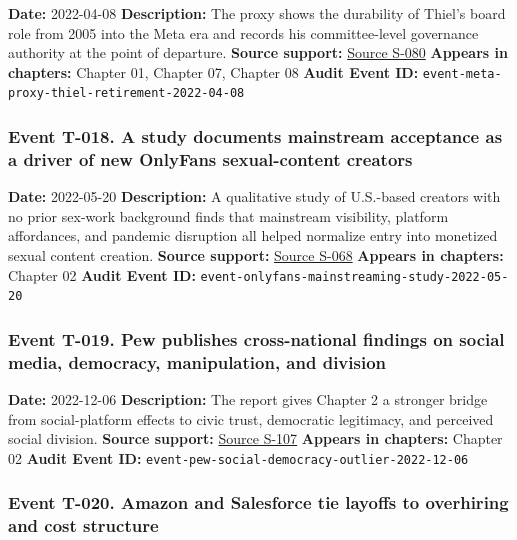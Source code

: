 \documentclass[
  american,
  11pt,
  letterpaper,
]{article}
\begin{document}
\textbf{Date:} 2022-04-08 \textbf{Description:} The proxy shows the
durability of Thiel's board role from 2005 into the Meta era and records
his committee-level governance authority at the point of departure.
\textbf{Source support:}
\hyperref[source-s-080-meta-platforms-inc-2022-definitive-proxy-statement]{Source
S-080} \textbf{Appears in chapters:} Chapter 01, Chapter 07, Chapter 08
\textbf{Audit Event ID:}
\texttt{event-meta-proxy-thiel-retirement-2022-04-08}

\subsubsection{Event T-018. A study documents mainstream acceptance as a
driver of new OnlyFans sexual-content
creators}\label{event-t-018-a-study-documents-mainstream-acceptance-as-a-driver-of-new-onlyfans-sexual-content-creators}

\textbf{Date:} 2022-05-20 \textbf{Description:} A qualitative study of
U.S.-based creators with no prior sex-work background finds that
mainstream visibility, platform affordances, and pandemic disruption all
helped normalize entry into monetized sexual content creation.
\textbf{Source support:}
\hyperref[source-s-068-nudes-shouldn-t-i-charge-for-these-motivations-of-new-sexual-content-creators-on-onlyfans]{Source
S-068} \textbf{Appears in chapters:} Chapter 02 \textbf{Audit Event ID:}
\texttt{event-onlyfans-mainstreaming-study-2022-05-20}

\subsubsection{Event T-019. Pew publishes cross-national findings on
social media, democracy, manipulation, and
division}\label{event-t-019-pew-publishes-cross-national-findings-on-social-media-democracy-manipulation-and-division}

\textbf{Date:} 2022-12-06 \textbf{Description:} The report gives Chapter
2 a stronger bridge from social-platform effects to civic trust,
democratic legitimacy, and perceived social division. \textbf{Source
support:}
\hyperref[source-s-107-social-media-seen-as-mostly-good-for-democracy-across-many-nations-but-u-s-is-a-major-outlier]{Source
S-107} \textbf{Appears in chapters:} Chapter 02 \textbf{Audit Event ID:}
\texttt{event-pew-social-democracy-outlier-2022-12-06}

\subsubsection{Event T-020. Amazon and Salesforce tie layoffs to
overhiring and cost
structure}\label{event-t-020-amazon-and-salesforce-tie-layoffs-to-overhiring-and-cost-structure}
\end{document}
